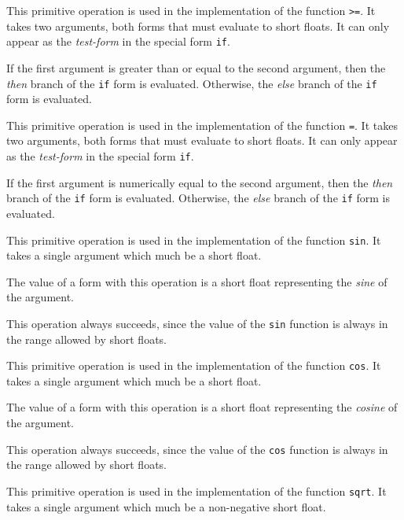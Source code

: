  {}

This primitive operation is used in the implementation of the
\commonlisp{} function \texttt{>=}.  It takes two arguments, both forms
that must evaluate to short floats.  It can only appear as the
\emph{test-form} in the special form \texttt{if}.

If the first argument is greater than or equal to the second argument,
then the \emph{then} branch of the \texttt{if} form is evaluated.
Otherwise, the \emph{else} branch of the \texttt{if} form is
evaluated.

 {}

This primitive operation is used in the implementation of the
\commonlisp{} function \texttt{=}.  It takes two arguments, both forms
that must evaluate to short floats.  It can only appear as the
\emph{test-form} in the special form \texttt{if}.

If the first argument is numerically equal to the second argument,
then the \emph{then} branch of the \texttt{if} form is evaluated.
Otherwise, the \emph{else} branch of the \texttt{if} form is
evaluated.

 {}

This primitive operation is used in the implementation of the
\commonlisp{} function \texttt{sin}.  It takes a single argument which
much be a short float.

The value of a form with this operation is a short float representing
the \emph{sine} of the argument.

This operation always succeeds, since the value of the \texttt{sin}
function is always in the range allowed by short floats.

 {}

This primitive operation is used in the implementation of the
\commonlisp{} function \texttt{cos}.  It takes a single argument which
much be a short float.

The value of a form with this operation is a short float representing
the \emph{cosine} of the argument.

This operation always succeeds, since the value of the \texttt{cos}
function is always in the range allowed by short floats.

 {}

This primitive operation is used in the implementation of the
\commonlisp{} function \texttt{sqrt}.  It takes a single argument which
much be a non-negative short float.

